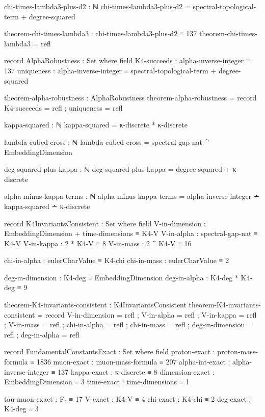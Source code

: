 \documentclass[11pt,a4paper]{book}
\begin{document}
\begin{code}
chi-times-lambda3-plus-d2 : ℕ
chi-times-lambda3-plus-d2 = spectral-topological-term + degree-squared

theorem-chi-times-lambda3 : chi-times-lambda3-plus-d2 ≡ 137
theorem-chi-times-lambda3 = refl

record AlphaRobustness : Set where
  field
    K4-succeeds : alpha-inverse-integer ≡ 137
    uniqueness  : alpha-inverse-integer ≡ spectral-topological-term + degree-squared

theorem-alpha-robustness : AlphaRobustness
theorem-alpha-robustness = record
  { K4-succeeds = refl
  ; uniqueness  = refl
  }

kappa-squared : ℕ
kappa-squared = κ-discrete * κ-discrete

lambda-cubed-cross : ℕ
lambda-cubed-cross = spectral-gap-nat ^ EmbeddingDimension

deg-squared-plus-kappa : ℕ
deg-squared-plus-kappa = degree-squared + κ-discrete

alpha-minus-kappa-terms : ℕ
alpha-minus-kappa-terms = alpha-inverse-integer ∸ kappa-squared ∸ κ-discrete

record K4InvariantsConsistent : Set where
  field
    V-in-dimension   : EmbeddingDimension + time-dimensions ≡ K4-V
    V-in-alpha       : spectral-gap-nat ≡ K4-V
    V-in-kappa       : 2 * K4-V ≡ 8
    V-in-mass        : 2 ^ K4-V ≡ 16
    
    chi-in-alpha     : eulerCharValue ≡ K4-chi
    chi-in-mass      : eulerCharValue ≡ 2
    
    deg-in-dimension : K4-deg ≡ EmbeddingDimension
    deg-in-alpha     : K4-deg * K4-deg ≡ 9

theorem-K4-invariants-consistent : K4InvariantsConsistent
theorem-K4-invariants-consistent = record
  { V-in-dimension   = refl
  ; V-in-alpha       = refl
  ; V-in-kappa       = refl
  ; V-in-mass        = refl
  ; chi-in-alpha     = refl
  ; chi-in-mass      = refl
  ; deg-in-dimension = refl
  ; deg-in-alpha     = refl
  }

record FundamentalConstantsExact : Set where
  field
    proton-exact     : proton-mass-formula ≡ 1836
    muon-exact       : muon-mass-formula ≡ 207
    alpha-int-exact  : alpha-inverse-integer ≡ 137
    kappa-exact      : κ-discrete ≡ 8
    dimension-exact  : EmbeddingDimension ≡ 3
    time-exact       : time-dimensions ≡ 1
    
    tau-muon-exact   : F₂ ≡ 17
    V-exact          : K4-V ≡ 4
    chi-exact        : K4-chi ≡ 2
    deg-exact        : K4-deg ≡ 3


\end{code}
\end{document}
